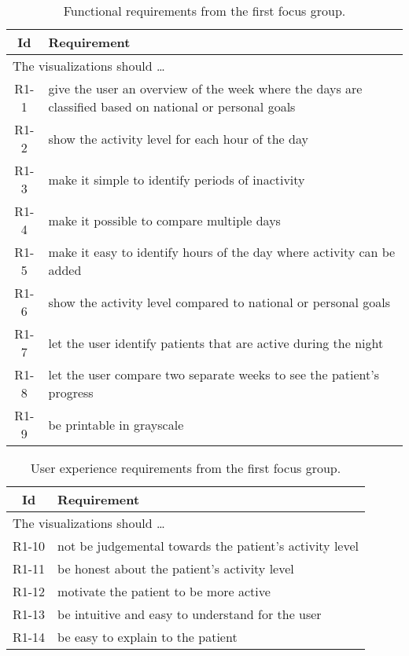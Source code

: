 \clearpage
\begin{table}[t]
  \begin{center}
  \begin{tabular}{|c|p{12cm}|}
    \hline
      \textbf{Id} & \textbf{Requirement} \\ \hline
    \multicolumn{2}{|l|}{The visualizations should \ldots} \\ \hline
      R1-1 & give the user an overview of the week where the days are classified based on national or personal goals \\ \hline
      R1-2 & show the activity level for each hour of the day \\ \hline
      R1-3 & make it simple to identify periods of inactivity \\ \hline
      R1-4 & make it possible to compare multiple days \\ \hline
      R1-5 & make it easy to identify hours of the day where activity can be added \\ \hline
      R1-6 & show the activity level compared to national or personal goals \\ \hline
      R1-7 & let the user identify patients that are active during the night \\ \hline
      R1-8 & let the user compare two separate weeks to see the patient's progress \\ \hline
      R1-9 & be printable in grayscale \\ \hline
  \end{tabular}
  \end{center}
  \caption[Functional requirements after the first focus group]{Functional requirements from the first focus group.}
  \label{tab:functionalReqFirstFocus}
\end{table}

\begin{table}[t]
  \begin{center}
  \begin{tabular}{|c|p{12cm}|}
    \hline
      \textbf{Id} & \textbf{Requirement} \\ \hline
    \multicolumn{2}{|l|}{The visualizations should \ldots} \\ \hline
      R1-10 & not be judgemental towards the patient's activity level \\ \hline
      R1-11 & be honest about the patient's activity level \\ \hline
      R1-12 & motivate the patient to be more active \\ \hline
      R1-13 & be intuitive and easy to understand for the user \\ \hline
      R1-14 & be easy to explain to the patient \\ \hline
  \end{tabular}
  \end{center}
  \caption[User experience requirements after the first focus group]{User experience requirements from the first focus group.}
  \label{tab:uxReqFirstFocus}
\end{table}

